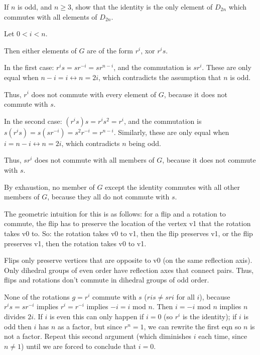 \documentclass[1    0pt, answers]{exam} \renewcommand{\baselinestretch}{1.05}
\theoremstyle{plain}
\theoremstyle{definition}
\begin{document}
\begin{questions}
\question If $n$ is odd, and $n \geq 3$, show that the identity is the only element of $D_{2n}$ which commutes with all elements of $D_{2n}$.
\begin{solution}
Let $0 < i < n$.

Then either elements of $G$ are of the form $r^i$, xor $r^i s$.

In the first case:
$r^i s = s r^{-i} = s r^{n-i}$,
and the commutation is $s r^i$.
These are only equal when $n-i = i \leftrightarrow n = 2i$,
which contradicts the assumption that $n$ is odd.

Thus, $r^i$ does not commute with every element of $G$, because it does not commute with $s$.

In the second case:
$(r^i s) s = r^i s^2 = r^i$,
and the commutation is $s (r^i s) = s (s r^{-i}) = s^2 r^{-i} = r^{n-i}$.
Similarly, these are only equal when $i = n-i \leftrightarrow n = 2i$,
which contradicts $n$ being odd.

Thus, $s r^i$ does not commute with all members of $G$, because it does not commute with $s$.

By exhaustion, no member of $G$ except the identity commutes with all other members of $G$, because they all do not commute with $s$.

The geometric intuition for this is as follows:
for a flip and a rotation to commute, the flip has to preserve the location of the vertex v1 that the rotation takes v0 to.
So: the rotation takes v0 to v1, then the flip preserves v1, or the flip preserves v1, then the rotation takes v0 to v1.

Flips only preserve vertices that are opposite to v0 (on the same reflection axis).
Only dihedral groups of even order have reflection axes that connect pairs.
Thus, flips and rotations don't commute in dihedral groups of odd order.
\end{solution}

\begin{solution}
None of the rotations $g = r^i$ commute with $s$ ($ri s \neq s ri$ for all $i$), because $r^i s = s r^{-i}$ implies $r^i = r^{-i}$ implies $-i = i$ mod $n$. Then $i = -i$ mod $n$ implies $n$ divides $2i$. If $i$ is even this can only happen if $i = 0$ (so $r^i$ is the identity); if $i$ is odd then $i$ has $n$ as a factor, but since $r^n = 1$, we can rewrite the first eqn so $n$ is not a factor. Repeat this second argument (which diminishes $i$ each time, since $n \neq 1$) until we are forced to conclude that $i = 0$.


\end{solution}
\end{questions}
\end{document}
